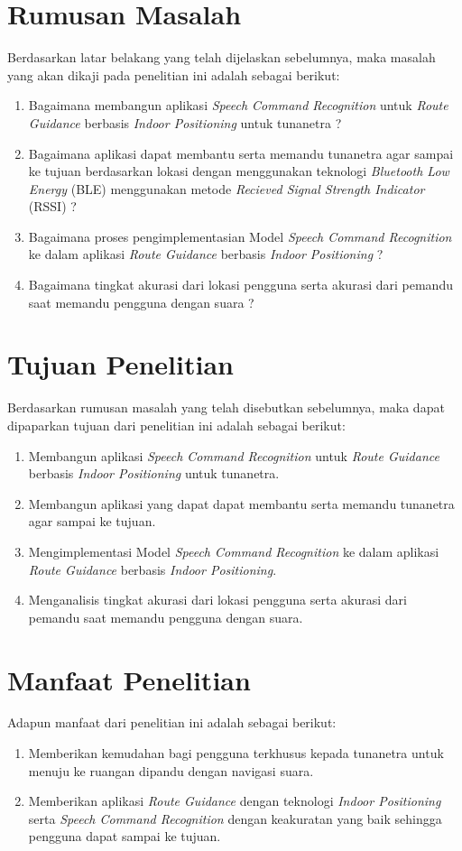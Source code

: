 \newpage


\section{Rumusan Masalah}
Berdasarkan latar belakang yang telah dijelaskan sebelumnya, maka masalah yang akan dikaji pada penelitian ini adalah sebagai berikut:
\begin{enumerate}
	\item Bagaimana membangun aplikasi \textit{Speech Command Recognition} untuk \textit{Route Guidance} berbasis \textit{Indoor Positioning} untuk tunanetra ?
	\item Bagaimana aplikasi dapat membantu serta memandu tunanetra agar sampai ke tujuan berdasarkan lokasi dengan menggunakan teknologi \textit{Bluetooth Low Energy }(BLE) menggunakan metode \textit{Recieved Signal Strength Indicator} (RSSI) ?
	\item Bagaimana proses pengimplementasian Model \textit{Speech Command Recognition} ke dalam aplikasi \textit{Route Guidance} berbasis \textit{Indoor Positioning} ?
	\item Bagaimana tingkat akurasi dari lokasi pengguna serta akurasi dari pemandu saat memandu pengguna dengan suara ?
\end{enumerate}

\section{Tujuan Penelitian}
Berdasarkan rumusan masalah yang telah disebutkan sebelumnya, maka dapat dipaparkan tujuan dari penelitian ini adalah sebagai berikut: 
\begin{enumerate}
	\item Membangun aplikasi \textit{Speech Command Recognition} untuk \textit{Route Guidance} berbasis \textit{Indoor Positioning} untuk tunanetra.
	\item Membangun aplikasi yang dapat dapat membantu serta memandu tunanetra agar sampai ke
tujuan.
	\item Mengimplementasi Model \textit{Speech Command Recognition} ke dalam aplikasi \textit{Route Guidance} berbasis \textit{Indoor Positioning}.
	\item Menganalisis tingkat akurasi dari lokasi pengguna serta akurasi dari pemandu saat memandu pengguna dengan suara.
\end{enumerate}


\section{Manfaat Penelitian}
Adapun manfaat dari penelitian ini adalah sebagai berikut:
\begin{enumerate}
	\item Memberikan kemudahan bagi pengguna terkhusus kepada tunanetra untuk menuju ke ruangan dipandu dengan navigasi suara.
	\item Memberikan aplikasi \textit{Route Guidance} dengan teknologi \textit{Indoor Positioning} serta \textit{Speech Command Recognition} dengan keakuratan yang baik sehingga pengguna dapat sampai ke tujuan.
\end{enumerate}


\fancyhf{} 
\fancyfoot[R]{\thepage}
\begin{comment}

\end{comment}